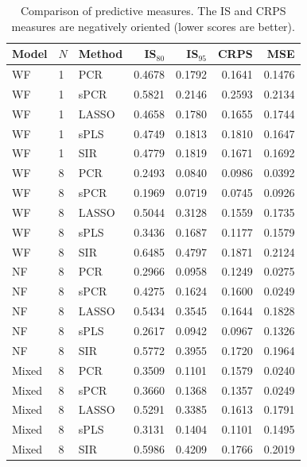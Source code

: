 \documentclass[12pt]{amsart}
\theoremstyle{plain}
\theoremstyle{definition}
\theoremstyle{remark}
\begin{document}
\begin{table}
  \centering
  {\small
\begin{tabular}{lll|rrr|r}
  \toprule
  \textbf{Model} & $N$ & \textbf{Method} & IS$_{80}$ & IS$_{95}$ & CRPS & MSE \\ 
  \midrule
  WF & 1 & PCR & 0.4678 & 0.1792 & 0.1641 & 0.1476 \\ 
  WF & 1 & sPCR & 0.5821 & 0.2146 & 0.2593 & 0.2134 \\ 
  WF & 1 & LASSO & 0.4658 & 0.1780 & 0.1655 & 0.1744 \\ 
  WF & 1 & sPLS & 0.4749 & 0.1813 & 0.1810 & 0.1647 \\ 
  WF & 1 & SIR & 0.4779 & 0.1819 & 0.1671 & 0.1692 \\
  \midrule
  WF & 8 & PCR & 0.2493 & 0.0840 & 0.0986 & 0.0392 \\ 
  WF & 8 & sPCR & 0.1969 & 0.0719 & 0.0745 & 0.0926 \\ 
  WF & 8 & LASSO & 0.5044 & 0.3128 & 0.1559 & 0.1735 \\ 
  WF & 8 & sPLS & 0.3436 & 0.1687 & 0.1177 & 0.1579 \\ 
  WF & 8 & SIR & 0.6485 & 0.4797 & 0.1871 & 0.2124 \\
  \midrule
  NF & 8 & PCR & 0.2966 & 0.0958 & 0.1249 & 0.0275 \\ 
  NF & 8 & sPCR & 0.4275 & 0.1624 & 0.1600 & 0.0249 \\ 
  NF & 8 & LASSO & 0.5434 & 0.3545 & 0.1644 & 0.1828 \\ 
  NF & 8 & sPLS & 0.2617 & 0.0942 & 0.0967 & 0.1326 \\ 
  NF & 8 & SIR & 0.5772 & 0.3955 & 0.1720 & 0.1964 \\
  \midrule
  Mixed & 8 & PCR & 0.3509 & 0.1101 & 0.1579 & 0.0240 \\ 
  Mixed & 8 & sPCR & 0.3660 & 0.1368 & 0.1357 & 0.0249 \\ 
  Mixed & 8 & LASSO & 0.5291 & 0.3385 & 0.1613 & 0.1791 \\ 
  Mixed & 8 & sPLS & 0.3131 & 0.1404 & 0.1101 & 0.1495 \\ 
  Mixed & 8 & SIR & 0.5986 & 0.4209 & 0.1766 & 0.2019 \\ 
   \bottomrule
\end{tabular}
}
\caption{Comparison of predictive measures. The IS and CRPS measures are
  negatively oriented (lower scores are better).}
\label{tab:comparisontot}
\end{table}
\end{document}
